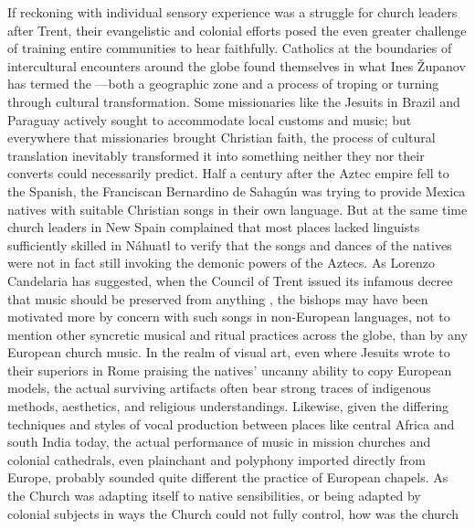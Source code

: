 If reckoning with individual sensory experience was a struggle for church
leaders after Trent, their evangelistic and colonial efforts posed the even
greater challenge of training entire communities to hear faithfully.
Catholics at the boundaries of intercultural encounters around the globe found
themselves in what Ines Županov has termed the ---both a geographic zone and a process of troping or turning through
cultural transformation.%
    \Autocite{Zupanov:MissionaryTropics}
Some missionaries like the Jesuits in Brazil and Paraguay actively sought to
accommodate local customs and music; but everywhere that missionaries brought
Christian faith, the process of cultural translation inevitably transformed it
into something neither they nor their converts could necessarily predict.%
    \Autocites
    {Castagna:JesuitsConversionBrazil}
    {Bailey:Art}
    {Fromont:DancingKingCongo}
Half a century after the Aztec empire fell to the Spanish, the Franciscan
Bernardino de Sahagún was trying to provide Mexica natives with suitable
Christian songs in their own language.
But at the same time church leaders in New Spain complained that most places
lacked linguists sufficiently skilled in Náhuatl to verify that the songs and
dances of the natives were not in fact still invoking the demonic powers of the
Aztecs.%
    \Autocite[637]{Candelaria:Psalmodia}
As Lorenzo Candelaria has suggested, when the Council of Trent issued its
infamous decree that music should be preserved from anything , the bishops may have been motivated more by concern with such songs
in non-European languages, not to mention other syncretic musical and ritual
practices across the globe, than by any European church music.%
    \Autocite[637--638]{Candelaria:Psalmodia}
In the realm of visual art, even where Jesuits wrote to their superiors in Rome
praising the natives' uncanny ability to copy European models, the actual
surviving artifacts often bear strong traces of indigenous methods, aesthetics,
and religious understandings.%
    \Autocite[27--29, 34]{Bailey:Art}
Likewise, given the differing techniques and styles of vocal production between
places like central Africa and south India today, the actual performance of
music in mission churches and colonial cathedrals, even plainchant and polyphony
imported directly from Europe, probably sounded quite different the practice of
European chapels.
As the Church was adapting itself to native sensibilities, or being adapted by
colonial subjects in ways the Church could not fully control, how was the church
